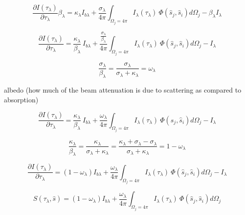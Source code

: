 \documentclass[12pt]{article}
\renewcommand{\_}{\kern-1.5pt\textunderscore\kern-1.5pt}
\begin{document}
\begin{itemize}
 \[ \frac{ \partial I \left(  \tau_{ \lambda } \right) }{ \partial  \tau_{ \lambda }} \beta _{ \lambda }= \kappa _{ \lambda }I_{b \lambda }+\frac{ \sigma _{ \lambda }}{4 \pi } \int _{ \Omega _{j}=4 \pi }^{}I_{ \lambda } \left(  \tau_{ \lambda } \right) ~ \Phi  \left( \hat{s}_{j},\hat{s}_{i} \right) d \Omega _{j}- \beta _{ \lambda }I_{ \lambda } \] \par

 \[ \frac{ \partial I \left(  \tau_{ \lambda } \right) }{ \partial  \tau_{ \lambda }}=\frac{ \kappa _{ \lambda }}{ \beta _{ \lambda }}~I_{b \lambda }+\frac{\frac{ \sigma _{ \lambda }}{ \beta _{ \lambda }}}{4 \pi } \int _{ \Omega _{j}=4 \pi }^{}I_{ \lambda } \left(  \tau_{ \lambda } \right) ~ \Phi  \left( \hat{s}_{j},\hat{s}_{i} \right) d \Omega _{j}-I_{ \lambda } \] \par

 \[ \frac{ \sigma _{ \lambda }}{ \beta _{ \lambda }}=\frac{ \sigma _{ \lambda }}{ \sigma _{ \lambda }+ \kappa _{ \lambda }}= \omega _{ \lambda } \] \par

albedo (how much of the beam attenuation is due to scattering as compared to absorption)\par

 \[ \frac{ \partial I \left(  \tau_{ \lambda } \right) }{ \partial  \tau_{ \lambda }}=\frac{ \kappa _{ \lambda }}{ \beta _{ \lambda }}~I_{b \lambda }+\frac{ \omega _{ \lambda }}{4 \pi } \int _{ \Omega _{j}=4 \pi }^{}I_{ \lambda } \left(  \tau_{ \lambda } \right) ~ \Phi  \left( \hat{s}_{j},\hat{s}_{i} \right) d \Omega _{j}-I_{ \lambda } \] \par

 \[ \frac{ \kappa _{ \lambda }}{ \beta _{ \lambda }}=\frac{ \kappa _{ \lambda }}{ \sigma _{ \lambda }+ \kappa _{ \lambda }}=\frac{ \kappa _{ \lambda }+ \sigma _{ \lambda }- \sigma _{ \lambda }}{ \sigma _{ \lambda }+ \kappa _{ \lambda }}=1- \omega _{ \lambda } \] \par

 \[ \frac{ \partial I \left(  \tau_{ \lambda } \right) }{ \partial  \tau_{ \lambda }}= \left( 1- \omega _{ \lambda } \right)  I_{b \lambda }+\frac{ \omega _{ \lambda }}{4 \pi } \int _{ \Omega _{j}=4 \pi }^{}I_{ \lambda } \left(  \tau_{ \lambda } \right) ~ \Phi  \left( \hat{s}_{j},\hat{s}_{i} \right) d \Omega _{j}-I_{ \lambda } \] \par

 \[ S \left(  \tau_{ \lambda },\hat{s} \right) = \left( 1- \omega _{ \lambda } \right)  I_{b \lambda }+\frac{ \omega _{ \lambda }}{4 \pi } \int _{ \Omega _{j}=4 \pi }^{}I_{ \lambda } \left(  \tau_{ \lambda } \right) ~ \Phi  \left( \hat{s}_{j},\hat{s}_{i} \right) d \Omega _{j} \] \par



\end{itemize}
\end{document}
